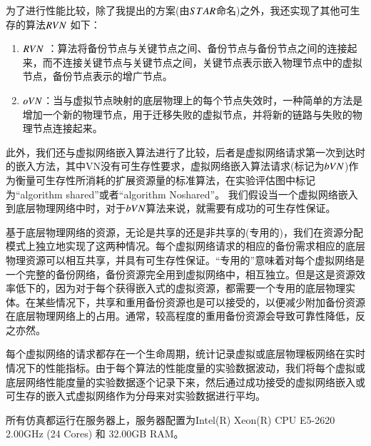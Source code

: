 为了进行性能比较，除了我提出的方案(由$STAR$命名)之外，我还实现了其他可生存的算法$RVN$  \cite{yeow2010designing}如下：
\begin{enumerate}
  \item $RVN$\cite{yeow2010designing} ：算法将备份节点与关键节点之间、备份节点与备份节点之间的连接起来，而不连接关键节点与关键节点之间，关键节点表示嵌入物理节点中的虚拟节点，备份节点表示的增广节点。
  \item $oVN$：当与虚拟节点映射的底层物理上的每个节点失效时，一种简单的方法是增加一个新的物理节点，用于迁移失败的虚拟节点，并将新的链路与失败的物理节点连接起来。
\end{enumerate}

此外，我们还与虚拟网络嵌入算法\cite{liu2011completing}进行了比较，后者是虚拟网络请求第一次到达时的嵌入方法，其中VN没有可生存性要求，虚拟网络嵌入算法请求(标记为$bVN$)作为衡量可生存性所消耗的扩展资源量的标准算法，在实验评估图中标记为“algorithm shared”或者“algorithm Noshared”。 我们假设当一个虚拟网络嵌入到底层物理网络中时，对于$bVN$算法来说，就需要有成功的可生存性保证。

基于底层物理网络的资源，无论是共享的还是非共享的(专用的)\cite{lu2006efficient}，我们在资源分配模式上独立地实现了这两种情况。每个虚拟网络请求的相应的备份需求相应的底层物理资源可以相互共享，并具有可生存性保证。“专用的”意味着对每个虚拟网络是一个完整的备份网络，备份资源完全用到虚拟网络中，相互独立。但是这是资源效率低下的，因为对于每个获得嵌入式的虚拟资源，都需要一个专用的底层物理实体。在某些情况下，共享和重用备份资源也是可以接受的，以便减少附加备份资源在底层物理网络上的占用。通常，较高程度的重用备份资源会导致可靠性降低，反之亦然。

每个虚拟网络的请求都存在一个生命周期，统计记录虚拟或底层物理板网络在实时情况下的性能指标。由于每个算法的性能度量的实验数据波动，我们将每个虚拟或底层网络性能度量的实验数据逐个记录下来，然后通过成功接受的虚拟网络嵌入或可生存的嵌入式虚拟网络作为分母来对实验数据进行平均。

所有仿真都运行在服务器上，服务器配置为Intel(R) Xeon(R) CPU E5-2620 2.00GHz (24 Cores) 和 32.00GB RAM。
